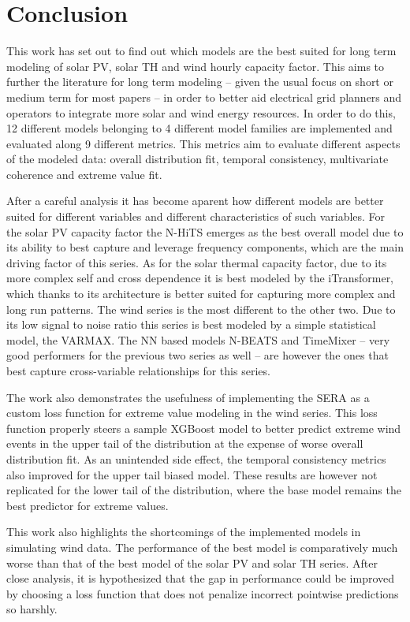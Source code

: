 \section{Conclusion}
This work has set out to find out which models are the best suited for long term modeling of solar PV, solar TH and wind hourly capacity factor. This aims to further the literature for long term modeling -- given the usual focus on short or medium term for most papers -- in order to better aid electrical grid planners and operators to integrate more solar and wind energy resources. In order to do this, 12 different models belonging to 4 different model families are implemented and evaluated along 9 different metrics. This metrics aim to evaluate different aspects of the modeled data: overall distribution fit, temporal consistency, multivariate coherence and extreme value fit. 

After a careful analysis it has become aparent how different models are better suited for different variables and different characteristics of such variables. For the solar PV capacity factor the N-HiTS emerges as the best overall model due to its ability to best capture and leverage frequency components, which are the main driving factor of this series. %
As for the solar thermal capacity factor, due to its more complex self and cross dependence it is best modeled by the iTransformer, which thanks to its architecture is better suited for capturing more complex and long run patterns. 
The wind series is the most different to the other two. Due to its low signal to noise ratio this series is best modeled by a simple statistical model, the VARMAX. The NN based models N-BEATS and TimeMixer -- very good performers for the previous two series as well -- are however the ones that best capture cross-variable relationships for this series. 

The work also demonstrates the usefulness of implementing the SERA as a custom loss function for extreme value modeling in the wind series. This loss function properly steers a sample XGBoost model to better predict extreme wind events in the upper tail of the distribution at the expense of worse overall distribution fit. As an unintended side effect, the temporal consistency metrics also improved for the upper tail biased model. These results are however not replicated for the lower tail of the distribution, where the base model remains the best predictor for extreme values. 

This work also highlights the shortcomings of the implemented models in simulating wind data. The performance of the best model is comparatively much worse than that of the best model of the solar PV and solar TH series. After close analysis, it is hypothesized that the gap in performance could be improved by choosing a loss function that does not penalize incorrect pointwise predictions so harshly.